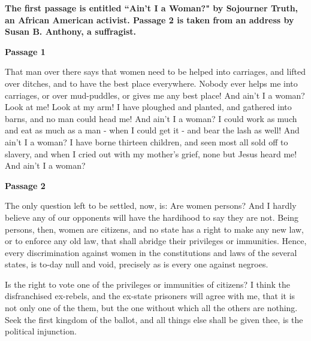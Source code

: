 \documentclass[12pt]{book}
\renewcommand{\indent}{\hspace{1cm}}
\begin{document}
\bigskip
\textbf{The first passage is entitled ``Ain't I a Woman?" by Sojourner Truth, an African American activist. Passage 2 is taken from an address by Susan B. Anthony, a suffragist.}

\bigskip
\textbf{Passage 1}

\bigskip
\begin{linenumbers*}
\modulolinenumbers[5]
\indent That man over there says that women need to be helped into carriages, and lifted over ditches, and to have the best place everywhere. Nobody ever helps me into carriages, or over mud-puddles, or gives me any best place! And ain't I a woman? Look at me! Look at my arm! I have ploughed and planted, and gathered into barns, and no man could head me! And ain't I a woman? I could work as much and eat as much as a man - when I could get it - and bear the lash as well! And ain't I a woman? I have borne thirteen children, and seen most all sold off to slavery, and when I cried out with my mother's grief, none but Jesus heard me! And ain't I a woman?
\end{linenumbers*}

\bigskip
\textbf{Passage 2}

\bigskip
\begin{linenumbers}
\modulolinenumbers[5]
\indent The only question left to be settled, now, is: Are women persons? And I hardly believe any of our opponents will have the hardihood to say they are not. Being persons, then, women are citizens, and no state has a right to make any new law, or to enforce any old law, that shall abridge their privileges or immunities. Hence, every discrimination against women in the constitutions and laws of the several states, is to-day null and void, precisely as is every one against negroes.

\indent Is the right to vote one of the privileges or immunities of citizens? I think the disfranchised ex-rebels, and the ex-state prisoners will agree with me, that it is not only one of the them, but the one without which all the others are nothing. Seek the first kingdom of the ballot, and all things else shall be given thee, is the political injunction.
\end{linenumbers}
\end{document}
